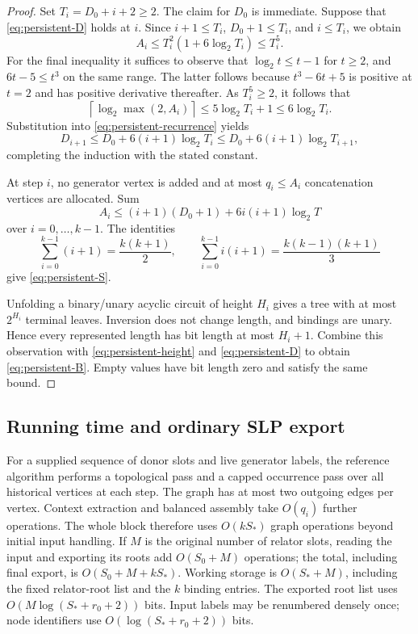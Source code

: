 \begin{proof}
Set $T_i=D_0+i+2\ge2$. The claim for $D_0$ is immediate. Suppose that
\eqref{eq:persistent-D} holds at $i$. Since $i+1\le T_i$,
$D_0+1\le T_i$, and $i\le T_i$, we obtain
\[
 A_i\le T_i^2(1+6\log_2 T_i)\le T_i^5.
\]
For the final inequality it suffices to observe that
$\log_2 t\le t-1$ for $t\ge2$, and
$6t-5\le t^3$ on the same range. The latter follows because
$t^3-6t+5$ is positive at $t=2$ and has positive derivative thereafter.
As $T_i^5\ge2$, it follows that
\[
 \left\lceil\log_2\max(2,A_i)\right\rceil
 \le5\log_2 T_i+1\le6\log_2 T_i.
\]
Substitution into \eqref{eq:persistent-recurrence} yields
\[
 D_{i+1}\le D_0+6(i+1)\log_2 T_i
          \le D_0+6(i+1)\log_2 T_{i+1},
\]
completing the induction with the stated constant.

At step $i$, no generator vertex is added and at most $q_i\le A_i$
concatenation vertices are allocated. Sum
\[
 A_i\le(i+1)(D_0+1)+6i(i+1)\log_2 T
\]
over $i=0,\ldots,k-1$. The identities
\[
 \sum_{i=0}^{k-1}(i+1)=\frac{k(k+1)}2,\qquad
 \sum_{i=0}^{k-1}i(i+1)=\frac{k(k-1)(k+1)}3
\]
give \eqref{eq:persistent-S}.

Unfolding a binary/unary acyclic circuit of height $H_i$ gives a tree
with at most $2^{H_i}$ terminal leaves. Inversion does not change length,
and bindings are unary. Hence every represented length has bit length
at most $H_i+1$. Combine this observation with
\eqref{eq:persistent-height} and \eqref{eq:persistent-D} to obtain
\eqref{eq:persistent-B}. Empty values have bit length zero and satisfy
the same bound.
\end{proof}

\subsection{Running time and ordinary SLP export}

For a supplied sequence of donor slots and live generator labels, the
reference algorithm performs a topological pass and a capped occurrence
pass over all historical vertices at each step. The graph has at most
two outgoing edges per vertex. Context extraction and balanced assembly
take $O(q_i)$ further operations. The whole block therefore uses
$O(kS_*)$ graph operations beyond initial input handling. If $M$ is the
original number of relator slots, reading the input and exporting its roots
add $O(S_0+M)$ operations; the total, including final export, is
$O(S_0+M+kS_*)$. Working storage is $O(S_*+M)$, including the fixed
relator-root list and the $k$ binding entries. The exported root list uses
$O(M\log(S_*+r_0+2))$ bits. Input labels may be
renumbered densely once; node identifiers use
$O(\log(S_*+r_0+2))$ bits.

